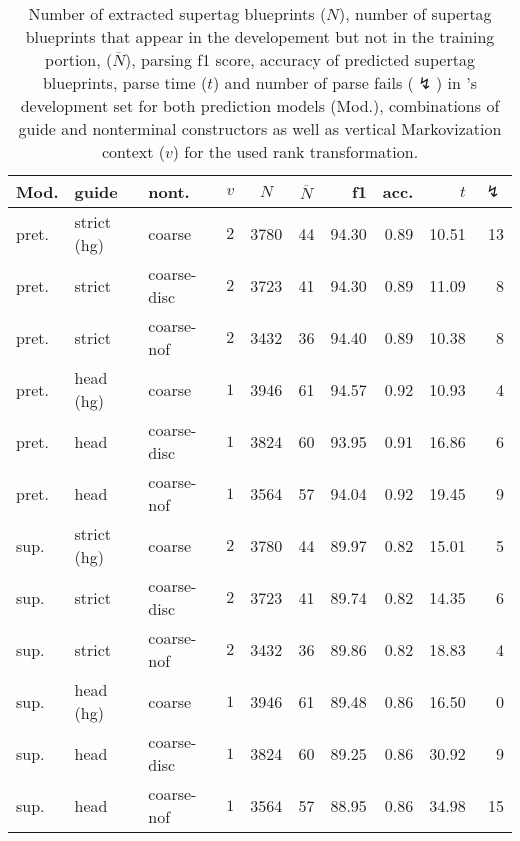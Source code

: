 \documentclass[../../document.tex]{subfiles}
\begin{document}
    \begin{table}
        \caption{\label{tbl:experiments:dptb:dcp}
        Number of extracted supertag blueprints ($N$), number of supertag blueprints that appear in the developement but not in the training portion, ($\overline{N}$), parsing f1 score, accuracy of predicted  supertag blueprints, parse time ($t$) and number of parse fails ($\lightning$) in 's development set for both prediction models (Mod.), combinations of guide and nonterminal constructors as well as vertical Markovization context ($v$) for the used rank transformation.
        }
        \centering
        \setlength{\tabcolsep}{4pt}
        \vspace{.2cm}
        \begin{tabular}{lllc|cc|rrrr}
            \toprule
Mod. &  guide &   nont.   &\(v\)   & $N$ & $\overline{N}$ & f1 & acc. & $t$ & $\lightning$ \\ \hline \rowcolor{black!10}
pret. & strict (hg) &  coarse       & \(2\) & 3780 & 44 & 94.30 & 0.89 & 10.51 & 13  \\\hline
pret. & strict      &  coarse-disc  & \(2\) & 3723 & 41  & 94.30 & 0.89 & 11.09 & 8  \\
pret. & strict      &  coarse-nof   & \(2\) & 3432 & 36 & 94.40 & 0.89 & 10.38 & 8  \\ \hline\rowcolor{black!10}
pret. & head  (hg)  &  coarse       & \(1\) & 3946 & 61 & 94.57 & 0.92 & 10.93 & 4  \\\hline
pret. & head        &  coarse-disc  & \(1\) & 3824 & 60 & 93.95 & 0.91 & 16.86 & 6  \\
pret. & head        &  coarse-nof   & \(1\) & 3564 & 57 & 94.04 & 0.92 & 19.45 & 9  \\
\midrule \rowcolor{black!10}
sup. & strict (hg) &  coarse        & \(2\) & 3780 & 44 & 89.97 & 0.82 & 15.01 & 5  \\\hline
sup. & strict    &  coarse-disc     & \(2\) & 3723 & 41 & 89.74 & 0.82 & 14.35 & 6  \\
sup. & strict     &  coarse-nof     & \(2\) & 3432 & 36 & 89.86 & 0.82 & 18.83 & 4  \\\hline\rowcolor{black!10}
sup. & head (hg)  &  coarse         & \(1\) & 3946 & 61 & 89.48 & 0.86 & 16.50 & 0  \\\hline
sup. & head      &  coarse-disc     & \(1\) & 3824 & 60 & 89.25 & 0.86 & 30.92 & 9  \\
sup. & head       &  coarse-nof     & \(1\) & 3564 & 57 & 88.95 & 0.86 & 34.98 & 15  \\
    \bottomrule
        \end{tabular}
    \end{table}
\end{document}

